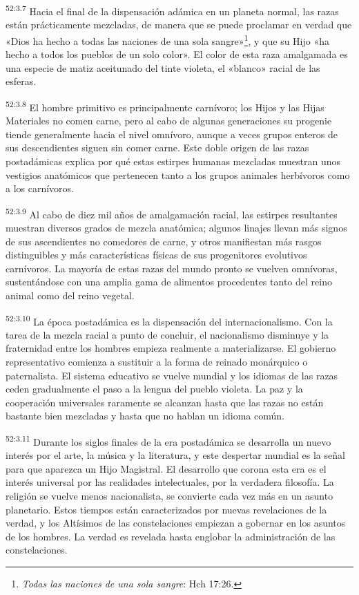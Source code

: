 \par
\textsuperscript{52:3.7} Hacia el final de la dispensación adámica en un planeta normal, las razas están prácticamente mezcladas, de manera que se puede proclamar en verdad que «Dios ha hecho a todas las naciones de una sola sangre»\footnote{\textit{Todas las naciones de una sola sangre}: Hch 17:26.}, y que su Hijo «ha hecho a todos los pueblos de un solo color». El color de esta raza amalgamada es una especie de matiz aceitunado del tinte violeta, el «blanco» racial de las esferas.

\par
\textsuperscript{52:3.8} El hombre primitivo es principalmente carnívoro; los Hijos y las Hijas Materiales no comen carne, pero al cabo de algunas generaciones su progenie tiende generalmente hacia el nivel omnívoro, aunque a veces grupos enteros de sus descendientes siguen sin comer carne. Este doble origen de las razas postadámicas explica por qué estas estirpes humanas mezcladas muestran unos vestigios anatómicos que pertenecen tanto a los grupos animales herbívoros como a los carnívoros.

\par
\textsuperscript{52:3.9} Al cabo de diez mil años de amalgamación racial, las estirpes resultantes muestran diversos grados de mezcla anatómica; algunos linajes llevan más signos de sus ascendientes no comedores de carne, y otros manifiestan más rasgos distinguibles y más características físicas de sus progenitores evolutivos carnívoros. La mayoría de estas razas del mundo pronto se vuelven omnívoras, sustentándose con una amplia gama de alimentos procedentes tanto del reino animal como del reino vegetal.

\par
\textsuperscript{52:3.10} La época postadámica es la dispensación del internacionalismo. Con la tarea de la mezcla racial a punto de concluir, el nacionalismo disminuye y la fraternidad entre los hombres empieza realmente a materializarse. El gobierno representativo comienza a sustituir a la forma de reinado monárquico o paternalista. El sistema educativo se vuelve mundial y los idiomas de las razas ceden gradualmente el paso a la lengua del pueblo violeta. La paz y la cooperación universales raramente se alcanzan hasta que las razas no están bastante bien mezcladas y hasta que no hablan un idioma común.

\par
\textsuperscript{52:3.11} Durante los siglos finales de la era postadámica se desarrolla un nuevo interés por el arte, la música y la literatura, y este despertar mundial es la señal para que aparezca un Hijo Magistral. El desarrollo que corona esta era es el interés universal por las realidades intelectuales, por la verdadera filosofía. La religión se vuelve menos nacionalista, se convierte cada vez más en un asunto planetario. Estos tiempos están caracterizados por nuevas revelaciones de la verdad, y los Altísimos de las constelaciones empiezan a gobernar en los asuntos de los hombres. La verdad es revelada hasta englobar la administración de las constelaciones.

